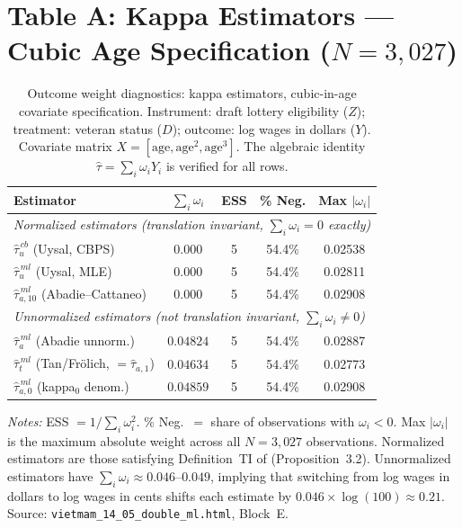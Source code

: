 \documentclass[12pt, a4paper]{article}
\begin{document}
\clearpage
\section*{Table A: Kappa Estimators --- Cubic Age Specification ($N = 3{,}027$)}

\begin{table}[ht]
\centering
\caption{Outcome weight diagnostics: kappa estimators, cubic-in-age
  covariate specification. Instrument: draft lottery eligibility ($Z$);
  treatment: veteran status ($D$); outcome: log wages in dollars ($Y$).
  Covariate matrix $X = [\text{age}, \text{age}^2, \text{age}^3]$.
  The algebraic identity $\hat{\tau} = \sum_i \omega_i Y_i$ is verified
  for all rows.}
\label{tab:kappa_cubic}
\vspace{6pt}
\begin{tabular}{lcccc}
\toprule
\textbf{Estimator} & $\sum_i \omega_i$ & \textbf{ESS} &
  \textbf{\% Neg.} & \textbf{Max $|\omega_i|$} \\
\midrule
\multicolumn{5}{l}{\textit{Normalized estimators (translation invariant,
  $\sum_i \omega_i = 0$ exactly)}} \\[3pt]
\rowcolor{normgreen}
$\hat{\tau}_u^{\,cb}$ \quad (Uysal, CBPS)   & $0.000$ & 5 & 54.4\% & 0.02538 \\
\rowcolor{normgreen}
$\hat{\tau}_u^{\,ml}$ \quad (Uysal, MLE)    & $0.000$ & 5 & 54.4\% & 0.02811 \\
\rowcolor{normgreen}
$\hat{\tau}_{a,10}^{\,ml}$ \quad (Abadie--Cattaneo) & $0.000$ & 5 & 54.4\% & 0.02908 \\
\midrule
\multicolumn{5}{l}{\textit{Unnormalized estimators (not translation
  invariant, $\sum_i \omega_i \neq 0$)}} \\[3pt]
\rowcolor{unnormred}
$\hat{\tau}_a^{\,ml}$ \quad (Abadie unnorm.) & $0.04824$ & 5 & 54.4\% & 0.02887 \\
\rowcolor{unnormred}
$\hat{\tau}_t^{\,ml}$ \quad (Tan/Fr\"{o}lich, $=\hat{\tau}_{a,1}$) & $0.04634$ & 5 & 54.4\% & 0.02773 \\
\rowcolor{unnormred}
$\hat{\tau}_{a,0}^{\,ml}$ \quad (kappa$_0$ denom.) & $0.04859$ & 5 & 54.4\% & 0.02908 \\
\bottomrule
\end{tabular}
\smallskip

\noindent\footnotesize
\textit{Notes:}
ESS $= 1 / \sum_i \omega_i^2$. \% Neg.\ $=$ share of observations with
$\omega_i < 0$. Max $|\omega_i|$ is the maximum absolute weight across all
$N = 3{,}027$ observations. Normalized estimators are those satisfying
Definition~TI of \citet{sloczyn2025kappa} (Proposition~3.2). Unnormalized
estimators have $\sum_i \omega_i \approx 0.046$--$0.049$, implying that
switching from log wages in dollars to log wages in cents shifts each
estimate by $0.046 \times \log(100) \approx 0.21$. Source: \texttt{vietmam\_14\_05\_double\_ml.html},
Block~E.
\end{table}
\end{document}
